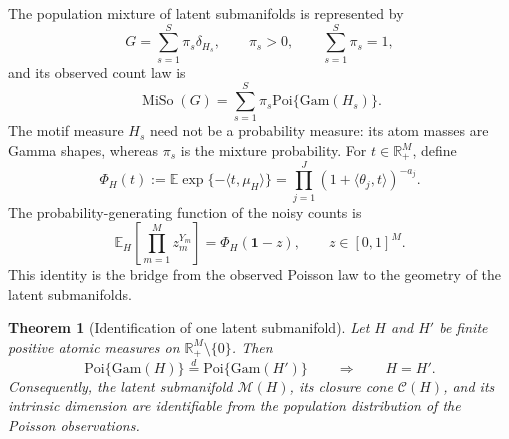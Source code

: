 \documentclass[11pt]{article}
\newcommand{\R}{\mathbb{R}}
\newcommand{\E}{\mathbb{E}}
\newcommand{\Poi}{\mathrm{Poi}}
\newcommand{\Gam}{\mathrm{Gam}}
\newcommand{\MiSo}{\operatorname{MiSo}}
\newcommand{\one}{\mathbf{1}}
\theoremstyle{plain}
\newtheorem{theorem}{Theorem}
\theoremstyle{definition}
\begin{document}
The population mixture of latent submanifolds is represented by
\begin{equation}
  G=\sum_{s=1}^{S}\pi_s\delta_{H_s},
  \qquad \pi_s>0,
  \qquad \sum_{s=1}^{S}\pi_s=1,
  \label{eq:G-main}
\end{equation}
and its observed count law is
\begin{equation}
  \MiSo(G)
  =\sum_{s=1}^{S}\pi_s\Poi\{\Gam(H_s)\}.
  \label{eq:MiSo-G-main}
\end{equation}
The motif measure $H_s$ need not be a probability measure: its atom masses
are Gamma shapes, whereas $\pi_s$ is the mixture probability.  For
$t\in\R_+^M$, define
\begin{equation}
  \Phi_H(t)
  :=\E\exp\{-\langle t,\mu_H\rangle\}
  =\prod_{j=1}^{J}(1+\langle\theta_j,t\rangle)^{-a_j}.
  \label{eq:Phi-H-main}
\end{equation}
The probability-generating function of the noisy counts is
\begin{equation}
  \E_H\!\left[\prod_{m=1}^{M}z_m^{Y_m}\right]
  =\Phi_H(\one-z),
  \qquad z\in[0,1]^M.
  \label{eq:pgf-main}
\end{equation}
This identity is the bridge from the observed Poisson law to the geometry of
the latent submanifolds.

\begin{theorem}[Identification of one latent submanifold]
\label{thm:H-identification-main}
Let $H$ and $H'$ be finite positive atomic measures on
$\R_+^M\setminus\{0\}$.  Then
\[
  \Poi\{\Gam(H)\}\overset{d}{=}\Poi\{\Gam(H')\}
  \qquad\Longrightarrow\qquad
  H=H'.
\]
Consequently, the latent submanifold $\mathcal M(H)$, its closure cone
$\mathcal C(H)$, and its intrinsic dimension are identifiable from the
population distribution of the Poisson observations.
\end{theorem}
\end{document}
